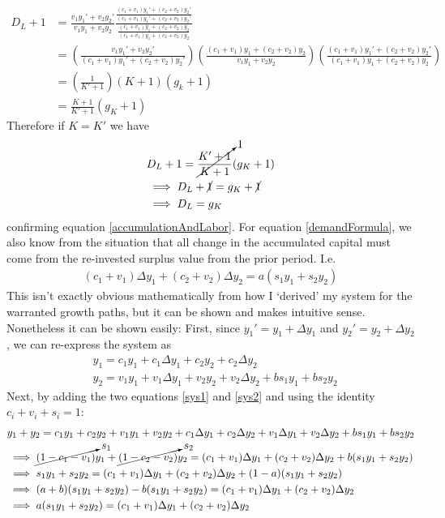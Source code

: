 \documentclass{article}
\theoremstyle{theorem}
\begin{document}
\begin{align}
	D_L+1 &= \frac{v_1 y_1' +v_2 y_2'}{v_1 y_1 + v_2 y_2} \frac{\frac{(c_1 + v_1)y_1' + (c_2 + v_2)y_2'}{(c_1 + v_1)y_1' + (c_2 + v_2)y_2'}}{\frac{(c_1 + v_1)y_1 + (c_2 + v_2)y_2}{(c_1 + v_1)y_1 + (c_2 + v_2)y_2}} \\
	&= \left( \frac{v_1 y_1' +v_2 y_2'}{(c_1 + v_1)y_1' + (c_2 + v_2)y_2'} \right) \left( \frac{(c_1 + v_1)y_1 + (c_2 + v_2)y_2}{v_1 y_1 + v_2 y_2} \right) \left( \frac{(c_1 + v_1)y_1' + (c_2 + v_2)y_2'}{(c_1 + v_1)y_1 + (c_2 + v_2)y_2} \right) \\
	&= \left( \frac{1}{K'+1} \right) \left( K+1 \right) \left( g_k+1 \right) \\
	&= \frac{K+1}{K'+1}(g_K+1)
\end{align}
Therefore if $K = K'$ we have 
\begin{align}
	& D_L+1 = \cancelto{1}{\frac{K'+1}{K+1}}(g_K+1) \\
	&\implies D_L+\cancel{1} = g_K+\cancel{1} \\
	&\implies D_L = g_K 
\end{align}
confirming equation \ref{accumulationAndLabor}. For equation \ref{demandFormula}, we also know from the situation that all change in the accumulated capital must come from the re-invested surplus value from the prior period. I.e.
\begin{align} \label{surplusEquation}
	(c_1 + v_1) \Delta y_1 + (c_2 + v_2) \Delta y_2 = a(s_1 y_1 + s_2 y_2)
\end{align}
This isn't exactly obvious mathematically from how I `derived' my system for the warranted growth paths, but it can be shown and makes intuitive sense. Nonetheless it can be shown easily: First, since $y_1' = y_1 + \Delta y_1$ and $y_2' = y_2 + \Delta y_2$, we can re-express the system as 
\begin{align}
	& y_1 = c_1 y_1 + c_1 \Delta y_1 + c_2 y_2 + c_2 \Delta y_2 \\
	& y_2 = v_1 y_1 + v_1 \Delta y_1 + v_2 y_2 + v_2 \Delta y_2 + bs_1 y_1 + b s_2y_2
\end{align}
Next, by adding the two equations \ref{sys1} and \ref{sys2} and using the identity $c_i + v_i + s_i = 1$:
\begin{align}
	& y_1 + y_2 = c_1 y_1 + c_2 y_2 + v_1 y_1 + v_2 y_2 + c_1 \Delta y_1 + c_2 \Delta y_2 + v_1 \Delta y_1 + v_2 \Delta y_2 +bs_1y_1 + bs_2y_2 \\
	&\implies \cancelto{s_1}{(1-c_1-v_1)} y_1 + \cancelto{s_2}{(1-c_2-v_2)}y_2= (c_1+v_1) \Delta y_1 + (c_2+v_2) \Delta y_2 + b(s_1y_1 + s_2y_2) \\
	&\implies s_1 y_1 + s_2y_2 = (c_1+v_1) \Delta y_1 + (c_2+v_2) \Delta y_2 + (1-a)(s_1y_1 + s_2y_2) \\
	&\implies (a+b)(s_1 y_1 + s_2 y_2) - b(s_1y_1 + s_2y_2)=(c_1+v_1) \Delta y_1 + (c_2+v_2) \Delta y_2  \\
	&\implies a(s_1y_1 + s_2y_2) = (c_1+v_1) \Delta y_1 + (c_2+v_2) \Delta y_2 
\end{align}
\end{document}
